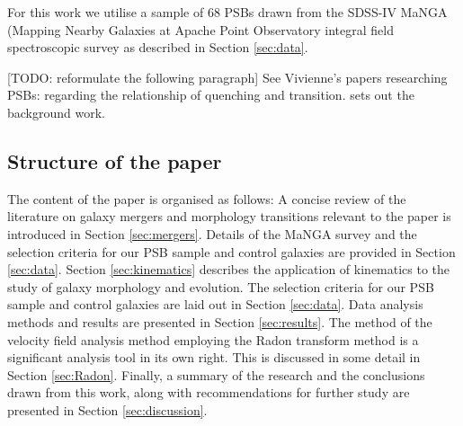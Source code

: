 For this work we utilise a sample of 68 PSBs drawn from the SDSS-IV MaNGA (Mapping Nearby Galaxies at Apache Point Observatory integral field spectroscopic survey  as described in Section \ref{sec:data}.

[TODO: reformulate the following paragraph] See Vivienne's  papers researching PSBs: \citet{2017MNRAS.472.1401A} regarding the relationship of quenching and transition. \citet{2016MNRAS.463..832W} sets out the background work.

\subsection{Structure of the paper}
The content of the paper is organised as follows: A concise review of the literature on galaxy mergers and morphology transitions relevant to the paper is introduced in Section \ref{sec:mergers}. Details of the MaNGA survey and the selection criteria for our PSB sample and control galaxies are provided in Section \ref{sec:data}. Section \ref{sec:kinematics} describes the application of kinematics to the study of galaxy morphology and evolution. The selection criteria for our PSB sample and control galaxies are laid out in Section \ref{sec:data}. Data analysis methods and results are presented in Section \ref{sec:results}. The method of the velocity field analysis method employing the Radon transform method is a significant analysis tool in its own right. This is discussed in some detail in Section \ref{sec:Radon}. Finally, a summary of the research and the conclusions drawn from this work, along with recommendations for further study are presented in Section \ref{sec:discussion}.
